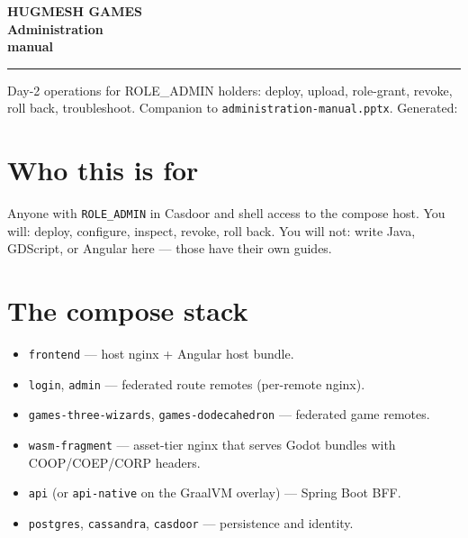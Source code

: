 \documentclass[11pt,a4paper,openany]{book}
\begin{document}
\begin{titlepage}\thispagestyle{empty}
\noindent{}
\vspace*{4cm}\noindent
{\sffamily\bfseries
  {\color{snapAccentTwo}\fontsize{18}{22}\selectfont HUGMESH GAMES}\\[3mm]
  {\color{white}\fontsize{42}{50}\selectfont Administration\\manual}\par}
\vspace{1.5cm}\noindent\color{white!75!snapAccentTwo}\rule{0.4\linewidth}{1.2pt}
\vspace{0.8cm}\noindent
{\sffamily\color{white!85}\large
Day-2 operations for ROLE\_ADMIN holders: deploy, upload, role-grant,
revoke, roll back, troubleshoot.}
\vfill\noindent
{\sffamily\color{white!70}\small
Companion to \texttt{administration-manual.pptx}. Generated: \snapbuilddate{} \snapbuildtime}
\end{titlepage}

\frontmatter\pagestyle{empty}\tableofcontents\clearpage
\mainmatter\pagestyle{fancy}

\chapter{Who this is for}
Anyone with \texttt{ROLE\_ADMIN} in Casdoor and shell access to the
compose host. You will: deploy, configure, inspect, revoke, roll back.
You will not: write Java, GDScript, or Angular here — those have their
own guides.

\chapter{The compose stack}

\begin{itemize}
  \item \texttt{frontend} — host nginx + Angular host bundle.
  \item \texttt{login}, \texttt{admin} — federated route remotes
        (per-remote nginx).
  \item \texttt{games-three-wizards}, \texttt{games-dodecahedron} —
        federated game remotes.
  \item \texttt{wasm-fragment} — asset-tier nginx that serves Godot
        bundles with COOP/COEP/CORP headers.
  \item \texttt{api} (or \texttt{api-native} on the GraalVM overlay) —
        Spring Boot BFF.
  \item \texttt{postgres}, \texttt{cassandra}, \texttt{casdoor} —
        persistence and identity.
\end{itemize}
\end{document}
